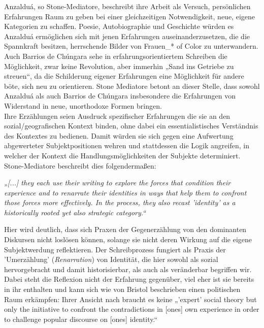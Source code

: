 Anzalduá, so Stone-Mediatore, beschreibt
ihre Arbeit als Versuch, persönlichen Erfahrungen Raum zu geben bei einer
gleichzeitigen Notwendigkeit, neue, eigene Kategorien zu schaffen. Poesie,
Autobiographie und Geschichte würden es Anzalduá ermöglichen sich mit jenen
Erfahrungen auseinanderzusetzen, die die Spannkraft besitzen, herrschende
Bilder von Frauen\_* of Color zu unterwandern.\footnotemark {} \\
Auch Barrios de Chúngara sehe in
erfahrungsorientiertem Schreiben die Möglichkeit, zwar keine Revolution, aber
immerhin „Sand ins Getriebe zu streuen“\footnotemark{}, da die Schilderung eigener
Erfahrungen eine Möglichkeit für andere böte, sich neu zu orientieren. Stone
Mediatore betont an dieser Stelle, dass sowohl Anzalduá als auch Barrios de
Chúngara insbesondere die Erfahrungen von Widerstand in neue, unorthodoxe
Formen bringen. \\
Ihre Erzählungen seien Ausdruck spezifischer Erfahrungen die
sie an den sozial/geografischen Kontext binden, ohne dabei ein
essentialistisches Verständnis des Kontextes zu bedienen. Damit würden sie sich
gegen eine Aufwertung abgewerteter Subjektpositionen wehren und stattdessen die
Logik angreifen, in welcher der Kontext die Handlungsmöglichkeiten der Subjekte
determiniert.\footnotemark {} Stone-Mediatore beschreibt dies folgendermaßen:
\begin{myenv}
    \textit{„[...] they each use their writing to explore the forces that
    condition their experience and to renarrate their identities in ways that
  help them to confront those forces more effectively. In the process, they
also recast 'identity' as a historically rooted yet also strategic
category.“\footnotemark {}}
\end{myenv}
Hier wird deutlich, dass sich Praxen der Gegenerzählung von den dominanten
Diskursen nicht loslösen können, solange sie nicht deren Wirkung auf die eigene
Subjektwerdung reflektieren. Der Schreibprozess fungiert als Praxis der
'Umerzählung' (\textit{Renarration}) von Identität, die hier sowohl als sozial
hervorgebracht und damit historisierbar, als auch als veränderbar begriffen
wir. Dabei steht die Reflexion nicht der Erfahrung gegenüber, viel eher ist sie
bereits in ihr enthalten und kann sich wie von Bristol beschrieben einen
politischen Raum erkämpfen:
Ihrer Ansicht nach  braucht es keine „'expert' social theory but only the
initiative to confront the contradictions in [ones] own experience in order to
challenge popular discourse on [ones]
identity.“\footnotemark{}\\


